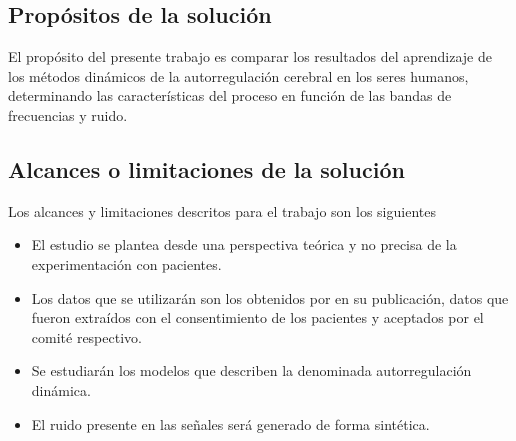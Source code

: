 \subsection{Propósitos de la solución}
El propósito del presente trabajo es comparar los resultados del aprendizaje de los métodos dinámicos de la autorregulación cerebral en los seres humanos, determinando las características del proceso en función de las bandas de frecuencias y ruido.

\subsection{Alcances o limitaciones de la solución}
Los alcances y limitaciones descritos para el trabajo son los siguientes
\begin{itemize}
	\item El estudio se plantea desde una perspectiva teórica y no precisa de la experimentación con pacientes.

    \item Los datos que se utilizarán son los obtenidos por \cite{Mahony2000} en su publicación, datos que fueron extraídos con el consentimiento de los pacientes y aceptados por el comité respectivo.

	\item Se estudiarán los modelos que describen la denominada autorregulación dinámica.

	\item El ruido presente en las señales será generado de forma sintética.
\end{itemize}
